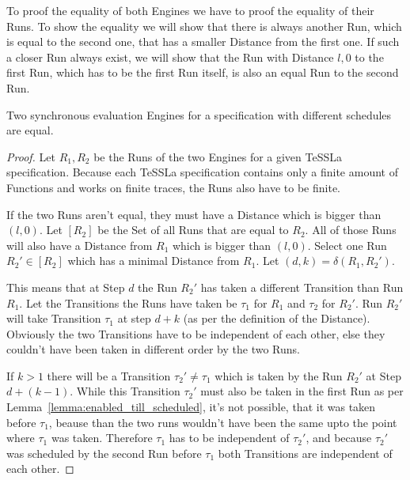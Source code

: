 To proof the equality of both Engines we have to proof the equality of their Runs.
To show the equality we will show that there is always another Run, which is equal to the second one, that has a smaller Distance from the first one.
If such a closer Run always exist, we will show that the Run with Distance \(l, 0\) to the first Run, which has to be the first Run itself, is also an equal Run to the second Run.

\begin{theorem}[name = Equality of different synchronous evaluation Engines]\label{theorem:equal_sync_eval_engines}
  Two synchronous evaluation Engines for a specification with different schedules are equal.
\end{theorem}
\begin{proof}

Let \(R_1, R_2\) be the Runs of the two Engines for a given TeSSLa specification.
Because each TeSSLa specification contains only a finite amount of Functions and works on finite traces, the Runs also have to be finite.

If the two Runs aren't equal, they must have a Distance which is bigger than \((l, 0)\).
Let \([R_2]\) be the Set of all Runs that are equal to \(R_2\).
All of those Runs will also have a Distance from \(R_1\) which is bigger than \((l, 0)\).
Select one Run \(R_2' \in [R_2]\) which has a minimal Distance from \(R_1\).
Let \((d,k) = \delta(R_1, R_2')\).

This means that at Step \(d\) the Run \(R_2'\) has taken a different Transition than Run \(R_1\).
Let the Transitions the Runs have taken be \(\tau_1\) for \(R_1\) and \(\tau_2\) for \(R_2'\).
Run \(R_2'\) will take Transition \(\tau_1\) at step \(d+k\) (as per the definition of the Distance).
Obviously the two Transitions have to be independent of each other, else they couldn't have been taken in different order by the two Runs.

If \(k > 1\) there will be a Transition \(\tau_2' \neq \tau_1\) which is taken by the Run \(R_2'\) at Step \(d+(k-1)\).
While this Transition \(\tau_2'\) must also be taken in the first Run as per Lemma~\ref{lemma:enabled_till_scheduled}, it's not possible, that it was taken before \(\tau_1\), beause than the two runs wouldn't have been the same upto the point where \(\tau_1\) was taken.
Therefore \(\tau_1\) has to be independent of \(\tau_2'\), and because \(\tau_2'\) was scheduled by the second Run before \(\tau_1\) both Transitions are independent of each other.


\end{proof}
